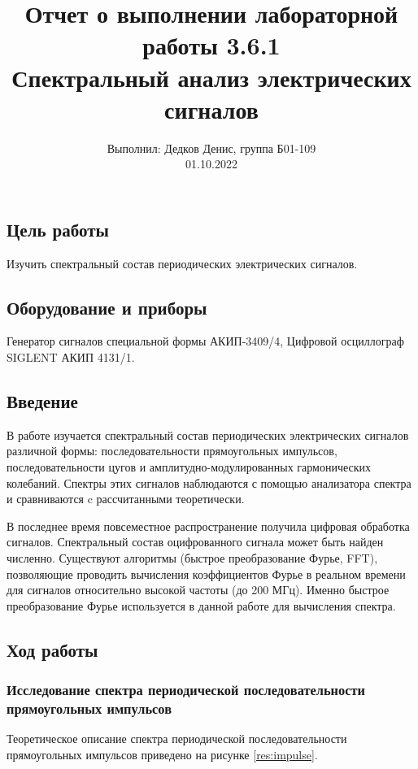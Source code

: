 \documentclass[12pt,a4paper]{article}
\author{\normalsize Выполнил: Дедков Денис, группа Б01-109 \\
	\normalsize 01.10.2022}
\date{}
\title{
	\large Отчет о выполнении лабораторной работы 3.6.1 \\
	\Large Спектральный анализ электрических сигналов \\ 
	
}
\begin{document}
\maketitle
\subsection*{Цель работы} Изучить спектральный состав периодических электрических сигналов.

\subsection*{Оборудование и приборы} Генератор сигналов специальной формы
АКИП-3409/4, Цифровой осциллограф SIGLENT АКИП 4131/1.

\subsection*{Введение}
В работе изучается спектральный состав периодических электрических сигналов различной формы: последовательности прямоугольных
импульсов, последовательности цугов и амплитудно-модулированных
гармонических колебаний. Спектры этих сигналов наблюдаются с помощью анализатора спектра и сравниваются c рассчитанными теоретически.

В последнее время повсеместное распространение получила цифровая обработка сигналов. Спектральный состав оцифрованного сигнала
может быть найден численно. Существуют алгоритмы (быстрое преобразование Фурье, FFT), позволяющие проводить вычисления коэффициентов Фурье в реальном времени для сигналов относительно высокой
частоты (до 200 МГц). Именно быстрое преобразование Фурье используется в данной работе для вычисления спектра.
\newpage
	
\subsection*{Ход работы}
\subsubsection*{ Исследование спектра периодической последовательности прямоугольных импульсов}
Теоретическое описание спектра периодической последовательности прямоугольных импульсов приведено на рисунке \ref{res:impulse}.
\end{document}
